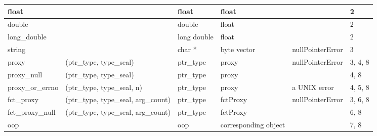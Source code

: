 \documentclass[letterpaper,10pt,english]{sphinxmanual}
\begin{document}
\begin{tabulary}{\linewidth}{p{2cm} p{2cm} p{2cm} p{2cm} p{2cm} p{2cm}}
float
 &  & 
float
 & 
float
 &  & 
2
\\\hline

double
 &  & 
double
 & 
float
 &  & 
2
\\\hline

long\_double
 &  & 
long double
 & 
float
 &  & 
2
\\\hline

string
 &  & 
char *
 & 
byte vector
 & 
nullPointerError
 & 
3
\\\hline

proxy
 & 
(ptr\_type, type\_seal)
 & 
ptr\_type
 & 
proxy
 & 
nullPointerError
 & 
3, 4, 8
\\\hline

proxy\_null
 & 
(ptr\_type, type\_seal)
 & 
ptr\_type
 & 
proxy
 &  & 
4, 8
\\\hline

proxy\_or\_errno
 & 
(ptr\_type, type\_seal, n)
 & 
ptr\_type
 & 
proxy
 & 
a UNIX error
 & 
4, 5, 8
\\\hline

fct\_proxy
 & 
(ptr\_type, type\_seal, arg\_count)
 & 
ptr\_type
 & 
fctProxy
 & 
nullPointerError
 & 
3, 6, 8
\\\hline

fct\_proxy\_null
 & 
(ptr\_type, type\_seal, arg\_count)
 & 
ptr\_type
 & 
fctProxy
 &  & 
6, 8
\\\hline

oop
 &  & 
oop
 & 
corresponding
object
 &  & 
7, 8
\\\hline
\end{tabulary}
\end{document}
